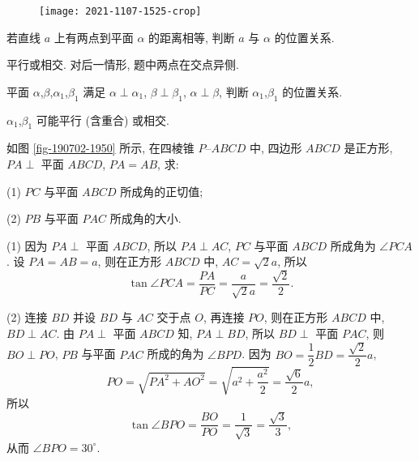\begin{figure}[htb]
  \small\centering
  \texttt{[image: 2021-1107-1525-crop]}
  \caption{}\label{fig-211107-1525}
\end{figure}

\lianxi

\begin{exercise}
    若直线 $a$ 上有两点到平面 $\alpha$ 的距离相等, 判断 $a$ 与 $\alpha$ 
    的位置关系.
\end{exercise}
\beginsolution
    平行或相交. 对后一情形, 题中两点在交点异侧.
\endsolution

\begin{exercise}
    平面 $\alpha$,$\beta$,$\alpha_1$,$\beta_1$ 满足 $\alpha\perp \alpha_1$, $\beta\perp\beta_1$, $\alpha\perp \beta$, 判断 $\alpha_1$,$\beta_1$ 的位置关系.
\end{exercise}
\beginsolution
    $\alpha_1$,$\beta_1$ 可能平行 (含重合) 或相交.
\endsolution

\begin{exercise}
    如图 \ref{fig-190702-1950} 所示, 在四棱锥 $P\text{--}ABCD$ 中, 四边形 $ABCD$ 是正方形, $PA\perp$ 平面 $ABCD$, $PA=AB$, 求:
    
    (1) $PC$ 与平面 $ABCD$ 所成角的正切值;
    
    (2) $PB$ 与平面 $PAC$ 所成角的大小.
\end{exercise}
\beginsolution
    (1) 因为 $PA\perp$ 平面 $ABCD$, 所以 $PA\perp AC$, $PC$ 与平面 $ABCD$ 所成角为 $\angle PCA$. 设 $PA=AB=a$, 则在正方形 $ABCD$ 中, $AC=\sqrt2 a$, 所以
    \[\tan\angle PCA= \frac{PA}{PC}= \frac{a}{\sqrt2 a}
        = \frac{\sqrt2}{2}.\]

    (2) 连接 $BD$ 并设 $BD$ 与 $AC$ 交于点 $O$, 再连接 $PO$, 则在正方形 $ABCD$ 中, $BD\perp AC$. 由 $PA\perp$ 平面 $ABCD$ 知, $PA\perp BD$, 所以 $BD\perp$ 平面  $PAC$, 则 $BO\perp PO$, $PB$ 与平面 $PAC$ 所成的角为 $\angle BPD$. 
    因为 $BO= \dfrac12 BD= \dfrac{\sqrt2}2 a$,
    \[PO= \sqrt{PA^2+ AO^2}= \sqrt{a^2+\frac{a^2}2}
        = \frac{\sqrt6}2 a,\]
    所以 
    \[\tan\angle BPO= \frac{BO}{PO}= \frac{1}{\sqrt3}
        = \frac{\sqrt3}{3},\]
    从而 $\angle BPO= 30^\circ$.
\endsolution

